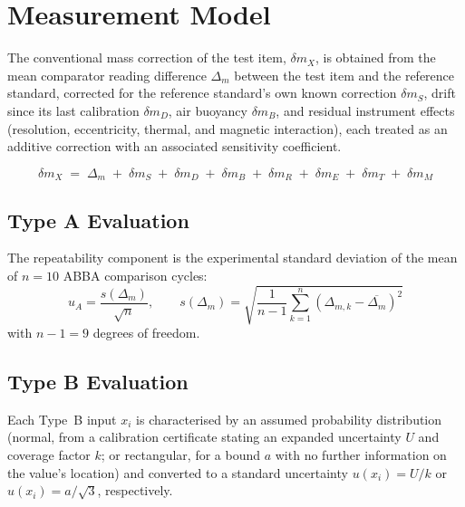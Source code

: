 \section{Measurement Model}

The conventional mass correction of the test item, $\delta m_X$, is obtained
from the mean comparator reading difference $\Delta_m$ between the test item
and the reference standard, corrected for the reference standard's own known
correction $\delta m_S$, drift since its last calibration $\delta m_D$, air
buoyancy $\delta m_B$, and residual instrument effects (resolution,
eccentricity, thermal, and magnetic interaction), each treated as an additive
correction with an associated sensitivity coefficient.

\begin{modelbox}
\begin{equation}
  \delta m_X \;=\; \Delta_m \;+\; \delta m_S \;+\; \delta m_D \;+\; \delta m_B
  \;+\; \delta m_R \;+\; \delta m_E \;+\; \delta m_T \;+\; \delta m_M
  \label{eq:model}
\end{equation}
\vspace{-4pt}
\end{modelbox}

\subsection{Type A Evaluation}
The repeatability component is the experimental standard deviation of the
mean of $n = 10$ ABBA comparison cycles:
\begin{equation}
  u_A = \frac{s(\Delta_m)}{\sqrt{n}}, \qquad
  s(\Delta_m) = \sqrt{\frac{1}{n-1}\sum_{k=1}^{n}\left(\Delta_{m,k} - \overline{\Delta_m}\right)^2}
\end{equation}
with $n - 1 = 9$ degrees of freedom.

\subsection{Type B Evaluation}
Each Type~B input $x_i$ is characterised by an assumed probability
distribution (normal, from a calibration certificate stating an expanded
uncertainty $U$ and coverage factor $k$; or rectangular, for a bound
$a$ with no further information on the value's location) and converted to a
standard uncertainty $u(x_i) = U/k$ or $u(x_i) = a/\sqrt{3}$, respectively.

